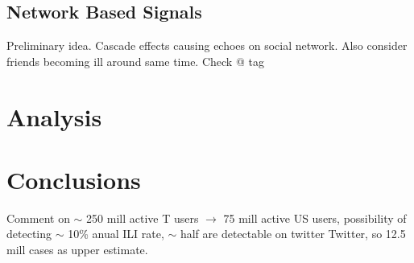 \documentclass{acm_proc_article-sp}
\begin{document}
\subsection{Network Based Signals}

Preliminary idea. Cascade effects causing echoes on social network. Also consider friends becoming ill around same time. Check @ tag

\section{Analysis}

\section{Conclusions}

Comment on \(\sim\) 250 mill active T users \(\to\) 75 mill active US users, possibility of detecting \(\sim\) 10\% anual ILI rate, \(\sim\) half are detectable on twitter Twitter, so 12.5 mill cases as upper estimate.






%

%
%

\balancecolumns
\end{document}
